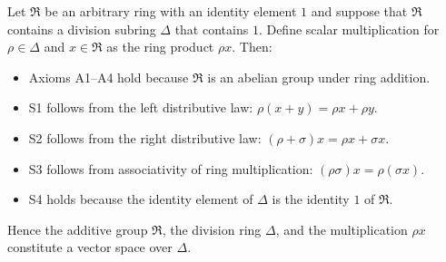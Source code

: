Let $\mathfrak{R}$ be an arbitrary ring with an identity element $1$ and suppose that $\mathfrak{R}$ contains a division subring $\Delta$ that contains $1$. Define scalar multiplication for $\rho \in \Delta$ and $x \in \mathfrak{R}$ as the ring product $\rho x$. Then:

\begin{itemize}
\item Axioms A1--A4 hold because $\mathfrak{R}$ is an abelian group under ring addition.
\item S1 follows from the left distributive law: $\rho(x + y) = \rho x + \rho y$.
\item S2 follows from the right distributive law: $(\rho + \sigma)x = \rho x + \sigma x$.
\item S3 follows from associativity of ring multiplication: $(\rho \sigma)x = \rho(\sigma x)$.
\item S4 holds because the identity element of $\Delta$ is the identity $1$ of $\mathfrak{R}$.
\end{itemize}

Hence the additive group $\mathfrak{R}$, the division ring $\Delta$, and the multiplication $\rho x$ constitute a vector space over $\Delta$.
